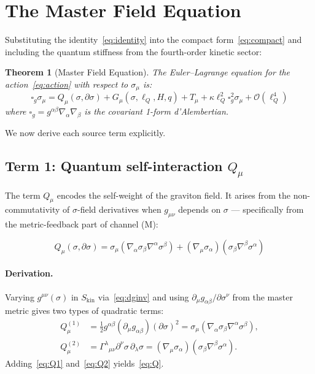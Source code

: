 \documentclass[11pt,a4paper]{article}
\theoremstyle{plain}
\newtheorem{theorem}{Theorem}[section]
\theoremstyle{definition}
\theoremstyle{remark}
\newcommand{\lQ}{\ell_Q}
\newcommand{\boxg}{\square_g}
\newcommand{\half}{\tfrac{1}{2}}
\newcommand{\Skin}{S_{\mathrm{kin}}}
\begin{document}
\section{The Master Field Equation}
\label{sec:master}

Substituting the identity~\eqref{eq:identity} into the compact form~\eqref{eq:compact}
and including the quantum stiffness from the fourth-order kinetic sector:

\begin{theorem}[Master Field Equation]
\label{thm:master}
The Euler--Lagrange equation for the action~\eqref{eq:action} with respect
to $\sigma_\mu$ is:
\begin{equation}
  \boxed{\boxg\sigma_\mu
    = Q_\mu(\sigma,\partial\sigma)
    + G_\mu(\sigma,\lQ,H,q)
    + T_\mu
    + \kappa\lQ^2\boxg^2\sigma_\mu
    + \mathcal{O}(\lQ^4)}
  \label{eq:master}
\end{equation}
where $\boxg = g^{\alpha\beta}\nabla_\alpha\nabla_\beta$ is the covariant
1-form d'Alembertian.
\end{theorem}

We now derive each source term explicitly.

\subsection{Term 1: Quantum self-interaction $Q_\mu$}
\label{sec:Qmu}

The term $Q_\mu$ encodes the self-weight of the graviton field.  It arises from the
non-commutativity of $\sigma$-field derivatives when $g_{\mu\nu}$ depends on $\sigma$
--- specifically from the metric-feedback part of channel (M):

\begin{equation}
  \boxed{Q_\mu(\sigma,\partial\sigma)
    = \sigma_\mu(\nabla_\alpha\sigma_\beta\nabla^\alpha\sigma^\beta)
    + (\nabla_\mu\sigma_\alpha)(\sigma_\beta\nabla^\beta\sigma^\alpha)}
  \label{eq:Q}
\end{equation}

\paragraph{Derivation.}  Varying $g^{\mu\nu}(\sigma)$ in $\Skin$ via~\eqref{eq:dginv}
and using $\partial_\mu g_{\alpha\beta}/\partial\sigma^\nu$ from the master metric gives
two types of quadratic terms:
\begin{align}
  Q_\mu^{(1)} &= \half g^{\alpha\beta}(\partial_\mu g_{\alpha\beta})(\partial\sigma)^2
                = \sigma_\mu(\nabla_\alpha\sigma_\beta\nabla^\alpha\sigma^\beta),
                \label{eq:Q1}\\
  Q_\mu^{(2)} &= \Gamma^\lambda{}_{\mu\nu}\partial^\nu\sigma\,\partial_\lambda\sigma
                = (\nabla_\mu\sigma_\alpha)(\sigma_\beta\nabla^\beta\sigma^\alpha).
                \label{eq:Q2}
\end{align}
Adding~\eqref{eq:Q1} and~\eqref{eq:Q2} yields~\eqref{eq:Q}.
\end{document}
